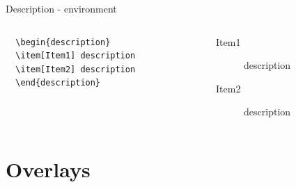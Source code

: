 \documentclass[[newPxFont]{beamer}
\begin{document}
\begin{frame}[fragile=singleslide]
  \vspace{-0.25cm}
\begin{block}{Description - environment}
\vspace{-0.5cm}
\begin{columns}
\begin{column}{.5\textwidth}
\begin{verbatim}
  \begin{description}
  \item[Item1] description
  \item[Item2] description
  \end{description}
\end{verbatim}
  \end{column}
  \begin{column}{.5\textwidth}
  \begin{description}
\item[Item1] description
\item[Item2] description
\end{description}
 \end{column}
 \end{columns}
\end{block}
\end{frame}
\section{Overlays}
\end{document}
